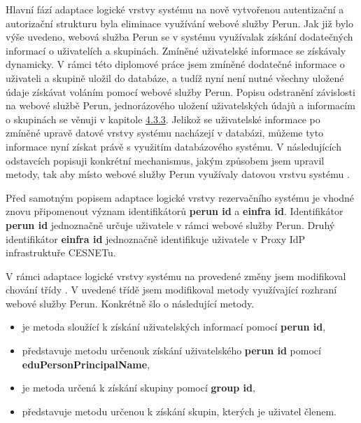 \documentclass[
  printed, %
  twoside, %
  table,   %
  nolof,     %
  nolot,     %
]{fithesis3}
\begin{document}
Hlavní fází adaptace logické vrstvy systému  na nově vytvořenou autentizační a autorizační strukturu byla eliminace využívání webové služby Perun. Jak již bylo výše uvedeno, webová služba Perun se v systému  využívala\break k získání dodatečných informací o uživatelích a skupinách. Zmíněné uživatelské informace se získávaly dynamicky. V rámci této diplomové práce jsem zmíněné dodatečné informace o uživateli a skupině uložil do databáze, a tudíž nyní není nutné všechny uložené údaje získávat voláním pomocí webové služby Perun. Popisu odstranění závislosti na webové službě Perun, jednorázového uložení uživatelských údajů a informacím o skupinách se věnuji v kapitole \hyperref[zpracovaniAUlozeniPerun]{4.3.3}. Jelikož se uživatelské informace po zmíněné upravě datové vrstvy systému  nacházejí v databázi, můžeme tyto informace nyní získat právě s využitím databázového systému. V následujících odstavcích popisuji konkrétní mechanismus, jakým způsobem jsem upravil metody, tak aby místo webové služby Perun využívaly datovou vrstvu systému . 

\par
Před samotným popisem adaptace logické vrstvy rezervačního systému  je vhodné znovu připomenout význam identifikátorů \textbf{perun id} a \textbf{einfra id}. Identifikátor \textbf{perun id} jednoznačně určuje uživatele v rámci webové služby Perun. Druhý identifikátor \textbf{einfra id} jednoznačně identifikuje uživatele v Proxy IdP infrastruktuře CESNETu. 
\par V rámci adaptace logické vrstvy systému  na provedené změny jsem modifikoval chování třídy . V uvedené třídě jsem modifikoval metody využívající rozhraní webové služby Perun. Konkrétně šlo o následující metody. 
\begin{itemize}
    \item {} je metoda sloužící k získání uživatelských informací pomocí \textbf{perun id}, 
    \item {} představuje metodu určenou\break k získání uživatelského \textbf{perun id} pomocí \textbf{eduPersonPrincipalName},
    \item {} je metoda určená k získání skupiny pomocí \textbf{group id},
    \item {} představuje metodu určenou k získání skupin, kterých je uživatel členem. 
\end{itemize}
\end{document}
